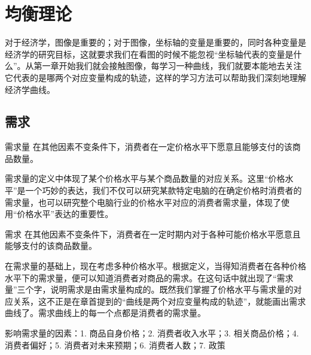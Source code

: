 \chapter{均衡理论}
\setlength{\parskip}{0.5\baselineskip}

对于经济学，图像是重要的；对于图像，坐标轴的变量是重要的，同时各种变量是经济学的研究目标，这就要求我们在看图的时候不能忽视“坐标轴代表的变量是什么”。从第一章开始我们就会接触图像，每学习一种曲线，我们就要本能地去关注它代表的是哪两个对应变量构成的轨迹，这样的学习方法可以帮助我们深刻地理解经济学曲线。

\section{需求}

\begin{definition}{需求量}
    在其他因素不变条件下，消费者在一定价格水平下愿意且能够支付的该商品数量。
\end{definition}

需求量的定义中体现了某个价格水平与某个商品数量的对应关系。这里“价格水平”是一个巧妙的表达，我们不仅可以研究某款特定电脑的在确定价格时消费者的需求量，也可以研究整个电脑行业的价格水平对应的消费者需求量，体现了使用“价格水平”表达的重要性。


\begin{definition}{需求}
    在其他因素不变条件下，消费者在一定时期内对于各种可能价格水平愿意且能够支付的该商品数量。
\end{definition}

在需求量的基础上，现在考虑多种价格水平。根据定义，当得知消费者在各种价格水平下的需求量，便可以知道消费者对商品的需求。在这句话中就出现了“需求量”三个字，说明需求是由需求量构成的。既然我们掌握了价格水平与需求量的对应关系，这不正是在章首提到的“曲线是两个对应变量构成的轨迹”，就能画出需求曲线了。需求曲线上的每一个点都是消费者的需求量。



影响需求量的因素：1. 商品自身价格；2. 消费者收入水平；3. 相关商品价格；4. 消费者偏好；5. 消费者对未来预期；6. 消费者人数；7. 政策
